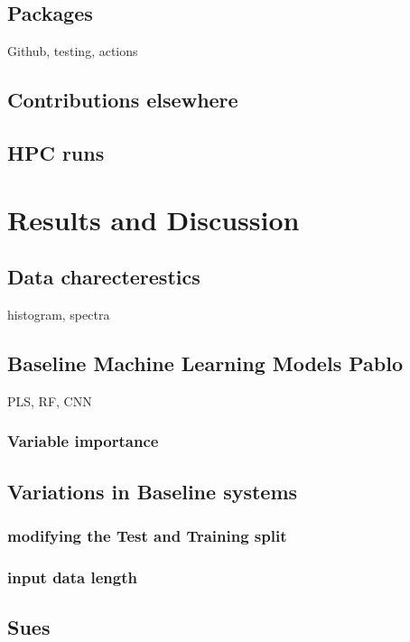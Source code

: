 \documentclass[12pt,a4paper]{report}
\begin{document}
\section{Packages}
Github, testing, actions
\section{Contributions elsewhere}
\section{HPC runs}


\chapter{Results and Discussion}

\section{Data charecterestics}
histogram, spectra
\section{Baseline Machine Learning Models Pablo}
PLS, RF, CNN

\subsection{Variable importance}

\section{ Variations in Baseline systems}
\subsection{ modifying the Test and Training split}
\subsection{ input data length}

\section{Sues}
\end{document}
